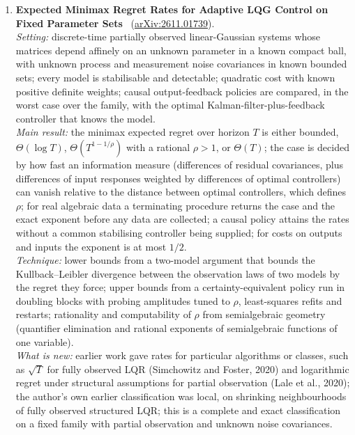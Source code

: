 \documentclass[11pt,a4paper]{article}
\begin{document}
\begin{enumerate}[leftmargin=*]
  \emph{Limitations:} two processes only; adversaries must be $\omega$-regular; no complexity bound for the decision procedure appears in the parts read, and no concrete decidable adversary is worked out there; the text read stopped in Section 6, before the conclusion.\\
  \emph{Verdict:} a tight characterisation, an exact decidability boundary, for controller synthesis over unreliable communication, with an unexpected link to consensus; confidence high (full text up to Section 6).
  \item \textbf{Expected Minimax Regret Rates for Adaptive LQG Control on Fixed Parameter Sets}~\cite{liu2026expected} (\href{https://arxiv.org/abs/2611.01739}{arXiv:2611.01739}).\\
  \emph{Setting:} discrete-time partially observed linear-Gaussian systems whose matrices depend affinely on an unknown parameter in a known compact ball, with unknown process and measurement noise covariances in known bounded sets; every model is stabilisable and detectable; quadratic cost with known positive definite weights; causal output-feedback policies are compared, in the worst case over the family, with the optimal Kalman-filter-plus-feedback controller that knows the model.\\
  \emph{Main result:} the minimax expected regret over horizon $T$ is either bounded, $\Theta(\log T)$, $\Theta(T^{1-1/\rho})$ with a rational $\rho > 1$, or $\Theta(T)$; the case is decided by how fast an information measure (differences of residual covariances, plus differences of input responses weighted by differences of optimal controllers) can vanish relative to the distance between optimal controllers, which defines $\rho$; for real algebraic data a terminating procedure returns the case and the exact exponent before any data are collected; a causal policy attains the rates without a common stabilising controller being supplied; for costs on outputs and inputs the exponent is at most $1/2$.\\
  \emph{Technique:} lower bounds from a two-model argument that bounds the Kullback--Leibler divergence between the observation laws of two models by the regret they force; upper bounds from a certainty-equivalent policy run in doubling blocks with probing amplitudes tuned to $\rho$, least-squares refits and restarts; rationality and computability of $\rho$ from semialgebraic geometry (quantifier elimination and rational exponents of semialgebraic functions of one variable).\\
  \emph{What is new:} earlier work gave rates for particular algorithms or classes, such as $\sqrt{T}$ for fully observed \ac{LQR} (Simchowitz and Foster, 2020) and logarithmic regret under structural assumptions for partial observation (Lale et al., 2020); the author's own earlier classification was local, on shrinking neighbourhoods of fully observed structured \ac{LQR}; this is a complete and exact classification on a fixed family with partial observation and unknown noise covariances.\\

\end{enumerate}
\end{document}

